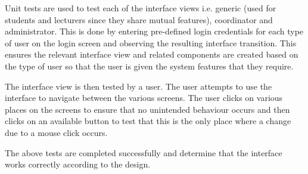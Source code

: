 Unit tests are used to test each of the interface views i.e. generic (used for students and lecturers since they share mutual features), coordinator and administrator. This is done by entering pre-defined login credentials for each type of user on the login screen and observing the resulting interface transition. This ensures the relevant interface view and related components are created based on the type of user so that the user is given the system features that they require.

The interface view is then tested by a user. The user attempts to use the interface to navigate between the various screens. The user clicks on various places on the screens to ensure that no unintended behaviour occurs and then clicks on an available button to test that this is the only place where a change due to a mouse click occurs.

The above tests are completed successfully and determine that the interface works correctly according to the design.
